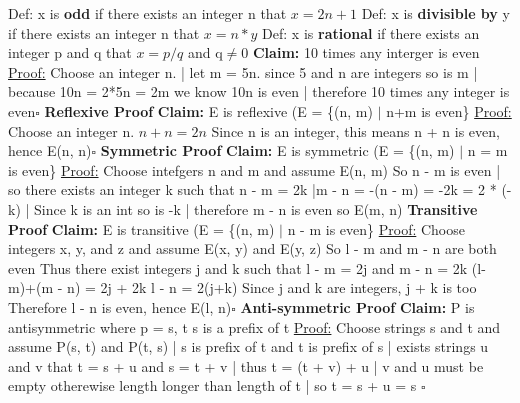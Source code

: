 \documentclass{article}
\begin{document}
\begin{tiny}
Def: x is \textbf{odd} if there exists an integer n that ${x = 2n + 1}$\newline
Def: x is \textbf{divisible by} y if there exists an integer n that ${x = n*y}$\newline
Def: x is \textbf{rational} if there exists an integer p and q that ${x = p/q}$ and q$\neq$0\newline\newline
\textbf{Claim: }10 times any interger is even\newline
\underline{Proof:} Choose an integer n. | let m = 5n. since 5 and n are integers so is m | because 10n = 2*5n = 2m we know 10n is even | therefore 10 times any integer is even$\square$\newline\newline
\textbf{Reflexive Proof}\newline
\textbf{Claim: }E is reflexive (E = \{(n, m) $\mid$ n+m is even\}\newline
\underline{Proof:} Choose an integer n.\newline
${n+n = 2n}$\newline
Since n is an integer, this means n + n is even, hence E(n, n)$\square$\newline\newline
\textbf{Symmetric Proof}\newline
\textbf{Claim: } E is symmetric (E = \{(n, m) $\mid$ n = m is even\}
\underline{Proof:} Choose intefgers n and m and assume E(n, m)\newline
So n - m is even | so there exists an integer k such that n - m = 2k |m - n = -(n - m) = -2k = 2 * (-k) | Since k is an int so is -k | therefore m - n is even so E(m, n)\newline\newline
\textbf{Transitive Proof}\newline
\textbf{Claim: }E is transitive (E = \{(n, m) $\mid$ n - m is even\}\newline
\underline{Proof:} Choose integers x, y, and z and assume E(x, y) and E(y, z)\newline
So l - m and m - n are both even\newline
Thus there exist integers j and k such that l - m = 2j and m - n = 2k\newline
(l-m)+(m - n) = 2j + 2k\newline
l - n = 2(j+k)\newline
Since j and k are integers, j + k is too\newline
Therefore l - n is even, hence E(l, n)$\square$\newline\newline
\textbf{Anti-symmetric Proof}\newline
\textbf{Claim: } P is antisymmetric where p = s, t s is a prefix of t\newline
\underline{Proof:} Choose strings s and t and assume P(s, t) and P(t, s) | s is prefix of t and t is prefix of s | exists strings u and v that t = s + u and s = t + v | thus t = (t + v) + u | v and u must be empty otherewise length longer than length of t | so t = s + u = s $\square$\newline\newline


\end{tiny}
\end{document}
